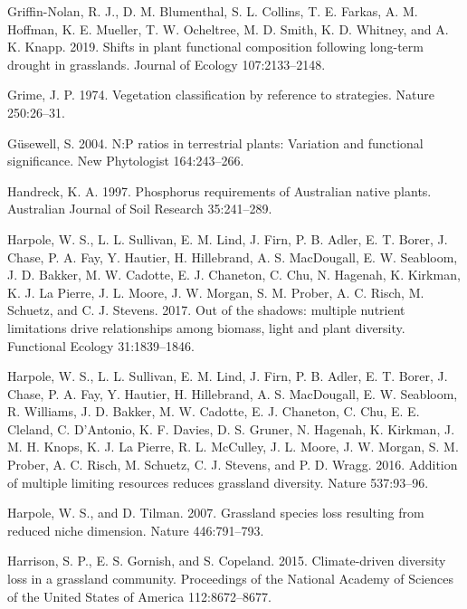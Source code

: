 \documentclass[twoside,12pt,final]{ucthesis-CA2012}
\begin{document}
\begin{ucmainmatter}
\leavevmode\hypertarget{ref-Griffin-Nolan2019}{}%
Griffin-Nolan, R. J., D. M. Blumenthal, S. L. Collins, T. E. Farkas, A. M. Hoffman, K. E. Mueller, T. W. Ocheltree, M. D. Smith, K. D. Whitney, and A. K. Knapp. 2019. Shifts in plant functional composition following long-term drought in grasslands. Journal of Ecology 107:2133--2148.

\leavevmode\hypertarget{ref-Grime1974}{}%
Grime, J. P. 1974. Vegetation classification by reference to strategies. Nature 250:26--31.

\leavevmode\hypertarget{ref-Gusewell2004}{}%
Güsewell, S. 2004. N:P ratios in terrestrial plants: Variation and functional significance. New Phytologist 164:243--266.

\leavevmode\hypertarget{ref-Handreck1997}{}%
Handreck, K. A. 1997. Phosphorus requirements of Australian native plants. Australian Journal of Soil Research 35:241--289.

\leavevmode\hypertarget{ref-Harpole2017}{}%
Harpole, W. S., L. L. Sullivan, E. M. Lind, J. Firn, P. B. Adler, E. T. Borer, J. Chase, P. A. Fay, Y. Hautier, H. Hillebrand, A. S. MacDougall, E. W. Seabloom, J. D. Bakker, M. W. Cadotte, E. J. Chaneton, C. Chu, N. Hagenah, K. Kirkman, K. J. La Pierre, J. L. Moore, J. W. Morgan, S. M. Prober, A. C. Risch, M. Schuetz, and C. J. Stevens. 2017. Out of the shadows: multiple nutrient limitations drive relationships among biomass, light and plant diversity. Functional Ecology 31:1839--1846.

\leavevmode\hypertarget{ref-Harpole2016}{}%
Harpole, W. S., L. L. Sullivan, E. M. Lind, J. Firn, P. B. Adler, E. T. Borer, J. Chase, P. A. Fay, Y. Hautier, H. Hillebrand, A. S. MacDougall, E. W. Seabloom, R. Williams, J. D. Bakker, M. W. Cadotte, E. J. Chaneton, C. Chu, E. E. Cleland, C. D'Antonio, K. F. Davies, D. S. Gruner, N. Hagenah, K. Kirkman, J. M. H. Knops, K. J. La Pierre, R. L. McCulley, J. L. Moore, J. W. Morgan, S. M. Prober, A. C. Risch, M. Schuetz, C. J. Stevens, and P. D. Wragg. 2016. Addition of multiple limiting resources reduces grassland diversity. Nature 537:93--96.

\leavevmode\hypertarget{ref-Harpole2007}{}%
Harpole, W. S., and D. Tilman. 2007. Grassland species loss resulting from reduced niche dimension. Nature 446:791--793.

\leavevmode\hypertarget{ref-Harrison2015}{}%
Harrison, S. P., E. S. Gornish, and S. Copeland. 2015. Climate-driven diversity loss in a grassland community. Proceedings of the National Academy of Sciences of the United States of America 112:8672--8677.


\end{ucmainmatter}
\end{document}
